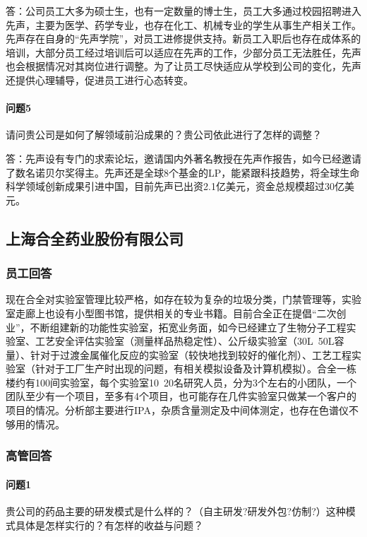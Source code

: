 \documentclass[twocolumn]{ctexbook}
\begin{document}
	答：公司员工大多为硕士生，也有一定数量的博士生，员工大多通过校园招聘进入先声，主要为医学、药学专业，也存在化工、机械专业的学生从事生产相关工作。先声存在自身的“先声学院”，对员工进修提供支持。新员工入职后也存在成体系的培训，大部分员工经过培训后可以适应在先声的工作，少部分员工无法胜任，先声也会根据情况对其岗位进行调整。为了让员工尽快适应从学校到公司的变化，先声还提供心理辅导，促进员工进行心态转变。
	
	\paragraph{问题5}请问贵公司是如何了解领域前沿成果的？贵公司依此进行了怎样的调整？
	
	答：先声设有专门的求索论坛，邀请国内外著名教授在先声作报告，如今已经邀请了数名诺贝尔奖得主。先声还是全球8个基金的LP，能紧跟科技趋势，将全球生命科学领域创新成果引进中国，目前先声已出资2.1亿美元，资金总规模超过30亿美元。
	
	
	\subsection*{上海合全药业股份有限公司}
	\subsubsection*{员工回答}
	现在合全对实验室管理比较严格，如存在较为复杂的垃圾分类，门禁管理等，实验室走廊上也设有小型图书馆，提供相关的专业书籍。目前合全正在提倡“二次创业”，不断组建新的功能性实验室，拓宽业务面，如今已经建立了生物分子工程实验室、工艺安全评估实验室（测量样品热稳定性）、公斤级实验室（30L~50L容量）、针对于过渡金属催化反应的实验室（较快地找到较好的催化剂）、工艺工程实验室（针对于工厂生产时出现的问题，有相关模拟设备及计算机模拟）。合全一栋楼约有100间实验室，每个实验室10~20名研究人员，分为3个左右的小团队，一个团队至少有一个项目，至多有4个项目，也可能存在几件实验室只做某一个客户的项目的情况。分析部主要进行IPA，杂质含量测定及中间体测定，也存在色谱仪不够用的情况。
	
	\subsubsection*{高管回答}
	
	\paragraph{问题1}贵公司的药品主要的研发模式是什么样的？（自主研发?研发外包?仿制?）这种模式具体是怎样实行的？有怎样的收益与问题？
	
\end{document}
